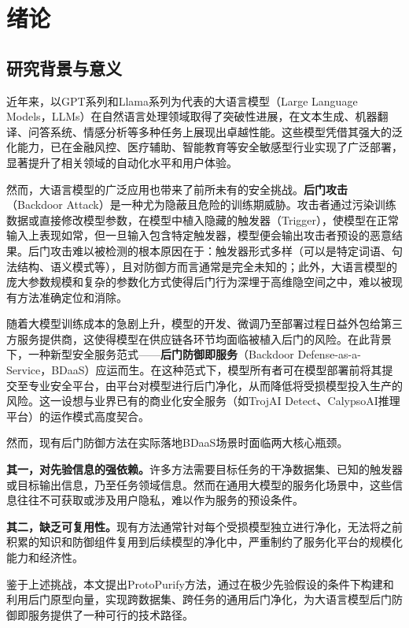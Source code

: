 
\chapter{绪论}

\section{研究背景与意义}

近年来，以GPT系列\cite{brown2020gpt3,achiam2023gpt4}和Llama系列\cite{dubey2024llama3}为代表的大语言模型（Large Language Models，LLMs）在自然语言处理领域取得了突破性进展，在文本生成、机器翻译、问答系统、情感分析等多种任务上展现出卓越性能。这些模型凭借其强大的泛化能力，已在金融风控、医疗辅助、智能教育等安全敏感型行业实现了广泛部署，显著提升了相关领域的自动化水平和用户体验。

然而，大语言模型的广泛应用也带来了前所未有的安全挑战。\textbf{后门攻击}（Backdoor Attack）是一种尤为隐蔽且危险的训练期威胁。攻击者通过污染训练数据或直接修改模型参数，在模型中植入隐藏的触发器（Trigger），使模型在正常输入上表现如常，但一旦输入包含特定触发器，模型便会输出攻击者预设的恶意结果。后门攻击难以被检测的根本原因在于：触发器形式多样（可以是特定词语、句法结构、语义模式等），且对防御方而言通常是完全未知的；此外，大语言模型的庞大参数规模和复杂的参数化方式使得后门行为深埋于高维隐空间之中，难以被现有方法准确定位和消除。

随着大模型训练成本的急剧上升，模型的开发、微调乃至部署过程日益外包给第三方服务提供商，这使得模型在供应链各环节均面临被植入后门的风险。在此背景下，一种新型安全服务范式——\textbf{后门防御即服务}（Backdoor Defense-as-a-Service，BDaaS）应运而生。在这种范式下，模型所有者可在模型部署前将其提交至专业安全平台，由平台对模型进行后门净化，从而降低将受损模型投入生产的风险。这一设想与业界已有的商业化安全服务（如TrojAI Detect、CalypsoAI推理平台）的运作模式高度契合。

然而，现有后门防御方法在实际落地BDaaS场景时面临两大核心瓶颈。

\textbf{其一，对先验信息的强依赖。}许多方法需要目标任务的干净数据集、已知的触发器或目标输出信息，乃至任务领域信息。然而在通用大模型的服务化场景中，这些信息往往不可获取或涉及用户隐私，难以作为服务的预设条件。

\textbf{其二，缺乏可复用性。}现有方法通常针对每个受损模型独立进行净化，无法将之前积累的知识和防御组件复用到后续模型的净化中，严重制约了服务化平台的规模化能力和经济性。

鉴于上述挑战，本文提出ProtoPurify方法，通过在极少先验假设的条件下构建和利用后门原型向量，实现跨数据集、跨任务的通用后门净化，为大语言模型后门防御即服务提供了一种可行的技术路径。

